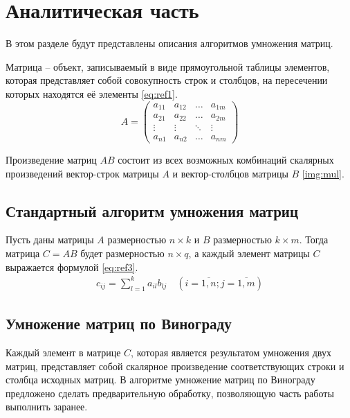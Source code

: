\chapter{Аналитическая часть}

В этом разделе будут представлены описания алгоритмов умножения матриц.

Матрица -- объект, записываемый в виде прямоугольной таблицы элементов, которая представляет собой совокупность строк и столбцов, на пересечении которых находятся её элементы \ref{eq:ref1}.
\begin{equation}
	A = \left(
	\begin{array}{cccc}
			a_{11} & a_{12} & \ldots & a_{1m} \\
			a_{21} & a_{22} & \ldots & a_{2m} \\
			\vdots & \vdots & \ddots & \vdots \\
			a_{n1} & a_{n2} & \ldots & a_{nm}
		\end{array}
	\right)
	\label{eq:ref1}
\end{equation}

Произведение матриц $AB$ состоит из всех возможных комбинаций скалярных произведений вектор-строк матрицы $A$ и вектор-столбцов матрицы $B$ \ref{img:mul}.


\section{Стандартный алгоритм умножения матриц}

Пусть даны матрицы $A$ размерностью $n \times k$ и $B$ размерностью $k \times m$.
Тогда матрица $C = AB$ будет размерностью $n \times q$, а каждый элемент матрицы $C$ выражается формулой \ref{eq:ref3}.
\begin{equation}
	\begin{array}{cc}
		c_{ij} = \sum\limits_{l=1}^k a_{il}b_{lj} \quad (i=\overline{1,n}; j=\overline{1,m})
	\end{array}
	\label{eq:ref3}
\end{equation}

\section{Умножение матриц по Винограду}

Каждый элемент в матрице $C$, которая является результатом умножения двух матриц, представляет собой скалярное произведение соответствующих строки и столбца исходных матриц. 
В алгоритме умножение матриц по Винограду предложено сделать предварительную обработку, позволяющую часть работы выполнить заранее.

